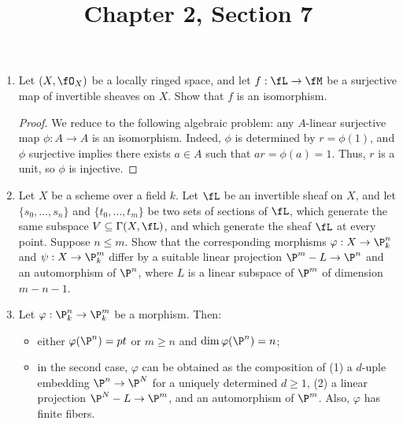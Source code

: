 \documentclass[a4paper]{article}
\title{Chapter 2, Section 7}
\begin{document}
\maketitle
\begin{enumerate} [label=\textbf{\arabic*.}, leftmargin=-0em]

    \item[\textbf{1.}] Let $(X, \fO_X)$ be a locally ringed space, and let $f : \fL \to \fM$ be a surjective map of invertible sheaves on $X$. Show that $f$ is an isomorphism.

          \begin{proof}
              We reduce to the following algebraic problem: any $A$-linear surjective map $\phi : A \to A$ is an isomorphism.
              Indeed, $\phi$ is determined by $r = \phi(1)$, and $\phi$ surjective implies there exists $a \in A$ such that $ar = \phi(a) = 1$. Thus, $r$ is a unit, so $\phi$ is injective.
          \end{proof}

    \item[\textbf{2.}] Let $X$ be a scheme over a field $k$. Let $\fL$ be an invertible sheaf on $X$, and let $\{ s_0, \dots, s_n \}$ and $\{ t_0, \dots, t_m \}$ be two sets of sections of $\fL$, which generate the same subspace $V \subseteq \Gamma(X, \fL)$, and which generate the sheaf $\fL$ at every point. Suppose $n \leq m$. Show that the corresponding morphisms $\varphi : X \to \P_k^n$ and $\psi : X \to \P_k^m$ differ by a suitable linear projection $\P^m - L \to \P^n$ and an automorphism of $\P^n$, where $L$ is a linear subspace of $\P^m$ of dimension $m - n - 1$.

    \item[\textbf{3.}] Let $\varphi : \P_k^n \to \P_k^m$ be a morphism. Then:
          \begin{itemize}
              \item[(a)] either $\varphi(\P^n) = pt$ or $m \geq n$ and $\dim{\varphi(\P^n)} = n$;
              \item[(b)] in the second case, $\varphi$ can be obtained as the composition of (1) a $d$-uple embedding $\P^n \to \P^N$ for a uniquely determined $d \geq 1$, (2) a linear projection $\P^N - L \to \P^m$, and an automorphism of $\P^m$. Also, $\varphi$ has finite fibers.
          \end{itemize}


\end{enumerate}
\end{document}
